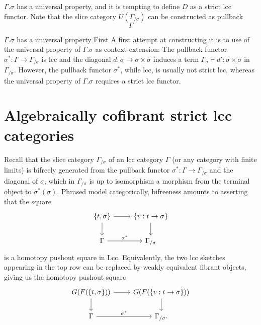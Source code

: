 \documentclass{article}
\theoremstyle{remark}
\theoremstyle{definition}
\begin{document}
$\Gamma.\sigma$ has a universal property, and it is tempting to define $D$ as a strict lcc functor.
Note that the slice category $U(\Gamma_{/ \sigma})$ can be constructed as pullback
\begin{equation}
  \Gamma
\end{equation}

$\Gamma.\sigma$ has a universal property
First
A first attempt at constructing it is to use of the universal property of $\Gamma.\sigma$ as context extension:
The pullback functor $\sigma^* : \Gamma \rightarrow \Gamma_{/ \sigma}$ is lcc and the diagonal $d : \sigma \rightarrow \sigma \times \sigma$ induces a term $\Gamma_{\sigma} \vdash d' : \sigma \times \sigma$ in $\Gamma_{/ \sigma}$.
However, the pullback functor $\sigma^*$, while lcc, is usually not strict lcc, whereas the universal property of $\Gamma.\sigma$ requires a strict lcc functor.

\section{Algebraically cofibrant strict lcc categories}
\label{sec:algebraically-cofibrant}

Recall that the slice category $\Gamma_{/ \sigma}$ of an lcc category $\Gamma$ (or any category with finite limits) is bifreely generated from the pullback functor $\sigma^* : \Gamma \rightarrow \Gamma_{/ \sigma}$ and the diagonal of $\sigma$, which in $\Gamma_{/ \sigma}$ is up to isomorphism a morphism from the terminal object to $\sigma^*(\sigma)$.
Phrased model categorically, bifreeness amounts to asserting that the square
\begin{equation}
  \label{eq:homotopy-pushout-lcc}
  \begin{tikzcd}
    \{ t, \sigma \} \arrow[r] \arrow[d] & \{ v : t \rightarrow \sigma \} \arrow[d] \\
    \Gamma \arrow[r, "\sigma^*"] & \Gamma_{/ \sigma}
  \end{tikzcd}
\end{equation}
is a homotopy pushout square in $\mathrm{Lcc}$.
Equivalently, the two lcc sketches appearing in the top row can be replaced by weakly equivalent fibrant objects, giving us the homotopy pushout square
\begin{equation}
  \label{eq:homotopy-pushout-lcc}
  \begin{tikzcd}
    G(F(\{ t, \sigma \})) \arrow[r] \arrow[d] & G(F(\{ v : t \rightarrow \sigma \})) \arrow[d] \\
    \Gamma \arrow[r, "\sigma^*"] & \Gamma_{/ \sigma}.
  \end{tikzcd}
\end{equation}
\end{document}
